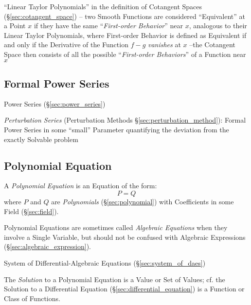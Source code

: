 ``Linear Taylor Polynomials'' in the definition of Cotangent Spaces
(\S\ref{sec:cotangent_space}) -- two Smooth Functions are considered
``Equivalent'' at a Point $x$ if they have the same ``\emph{First-order
  Behavior}'' near $x$, analogous to their Linear Taylor Polynomials,
where First-order Behavior is defined as Equivalent if and only if the
Derivative of the Function $f-g$ \emph{vanishes} at $x$ --the Cotangent Space
then consists of all the possible ``\emph{First-order Behaviors}'' of a
Function near $x$



\subsection{Formal Power Series}\label{sec:formal_power_series}

\fist Power Series (\S\ref{sec:power_series})

\fist \emph{Perturbation Series} (Perturbation Methods
\S\ref{sec:perturbation_method}): Formal Power Series in some ``small''
Parameter quantifying the deviation from the exactly Solvable problem



\subsection{Polynomial Equation}\label{sec:polynomial_equation}

A \emph{Polynomial Equation} is an Equation of the form:
\[
  P = Q
\]
where $P$ and $Q$ are \emph{Polynomials} (\S\ref{sec:polynomial}) with
Coefficients in some Field (\S\ref{sec:field}).

\fist Polynomial Equations are sometimes called \emph{Algebraic Equations} when
they involve a Single Variable, but should not be confused with Algebraic
Expressions (\S\ref{sec:algebraic_expression}).

\fist System of Differential-Algebraic Equations (\S\ref{sec:system_of_daes})

The \emph{Solution} to a Polynomial Equation is a Value or Set of Values; cf.
the Solution to a Differential Equation (\S\ref{sec:differential_equation}) is
a Function or Class of Functions.

